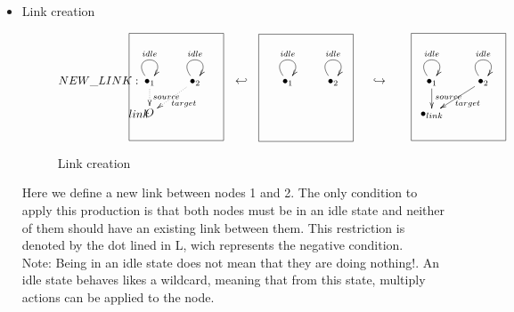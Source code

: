 \documentclass[envcountsect,runningheads]{llncs}
\begin{document}
\begin{itemize}
  \item Link creation
  \begin{figure}[H]
    \[
       \xymatrix@C=25pt@R=16pt
       {
        {\bullet}_{1}\ar@(ul,ur)^{idle} \ar@{.>}^{source}[d]
        \POS[]-<3.8pc,0pc>\drop{NEW\_LINK:} &
         {\bullet}_{2}\ar@(ul,ur)^{idle}\ar@{.>}^{target}[dl]
         & {\hookleftarrow} &
         {\bullet}_{1}\ar@(ul,ur)^{idle} &
         {\bullet}_{2}\ar@(ul,ur)^{idle}
         \POS[]+<-2pc,-.5pc>*+=<7pc,8pc>[F-]{} & {\hookrightarrow} &
         {\bullet}_{1}\ar@(ul,ur)^{idle} \ar@{->}^{source}[d] &
         {\bullet}_{2} \ar@(ul,ur)^{idle}\ar@{->}^{target}[dl]
         \\
         O \POS[]-<.8pc,0pc> \drop{link}
         \POS[]+<2pc,2pc>*+=<7pc,8pc>[F-]{} & & & & & &
         {\bullet}_{link} 
         \POS[]+<2pc,2pc>*+=<7pc,8pc>[F-]{} 
       }
    \]
    \caption{Link creation}
    \protect\label{fig:linkcreation}
  \end{figure}
  Here we define a new link between nodes 1 and 2. The only condition to apply 
  this production is that both nodes must be in an idle state and neither of them should have an 
  existing link between them. This restriction is denoted by the dot lined in L, 
  wich represents the negative condition.\\
  Note: Being in an idle state does not mean that they are doing nothing!. An 
  idle state behaves likes a wildcard, meaning that from this state, multiply actions 
  can be applied to the node.\\
  

\end{itemize}
\end{document}
